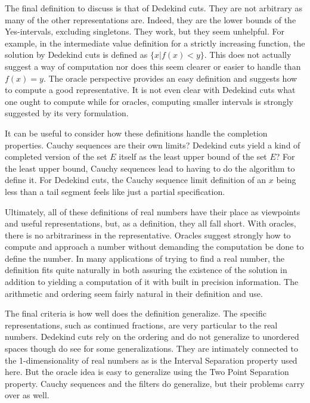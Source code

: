 \documentclass[12pt]{article}
\begin{document}
The final definition to discuss is that of Dedekind cuts. They are not arbitrary as many of the other representations are. Indeed, they are the lower bounds of the Yes-intervals, excluding singletons. They work, but they seem unhelpful. For example, in the intermediate value definition for a strictly increasing function, the solution by Dedekind cuts is defined as $\{x | f(x) < y\}$. This does not actually suggest a way of computation nor does this seem clearer or easier to handle than $f(x) = y$. The oracle perspective provides an easy definition and suggests how to compute a good representative. It is not even clear with Dedekind cuts what one ought to compute while for oracles, computing smaller intervals is strongly suggested by its very formulation. 

It can be useful to consider how these definitions handle the completion properties. Cauchy sequences are their own limits? Dedekind cuts yield a kind of completed version of the set $E$ itself as the least upper bound of the set $E$? For the least upper bound, Cauchy sequences lead to having to do the algorithm to define it. For Dedekind cuts, the Cauchy sequence limit definition of an $x$ being less than a tail segment feels like just a partial specification. 

Ultimately, all of these definitions of real numbers have their place as viewpoints and useful representations, but, as a definition, they all fall short. With oracles, there is no arbitrariness in the representative. Oracles suggest strongly how to compute and approach a number without demanding the computation be done to define the number. In many applications of trying to find a real number, the definition fits quite naturally in both assuring the existence of the solution in addition to yielding a computation of it with built in precision information. The arithmetic and ordering seem fairly natural in their definition and use. 

The final criteria is how well does the definition generalize. The specific representations, such as continued fractions, are very particular to the real numbers. Dedekind cuts rely on the ordering and do not generalize to unordered spaces though do see \cite{maudlin} for some generalizations. They are intimately connected to the 1-dimensionality of real numbers as is the Interval Separation property used here. But the oracle idea is easy to generalize using the Two Point Separation property. Cauchy sequences and the filters do generalize, but their problems carry over as well. 
\end{document}
